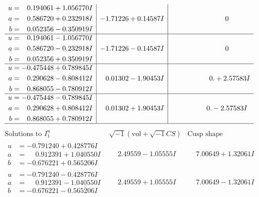 \documentclass[1p]{elsarticle_modified}
\theoremstyle{definition}
\newcommand{\I}{\sqrt{-1}}
\begin{document}
$$\begin{array}{c|c|c}
\begin{aligned}
u &= \phantom{-}0.194061 + 1.056770 I \\
a &= \phantom{-}0.586720 + 0.232918 I \\
b &= \phantom{-}0.052356 - 0.350919 I\end{aligned}
 & -1.71226 + 0.14587 I & \phantom{-0.000000 } 0 \\ \hline\begin{aligned}
u &= \phantom{-}0.194061 - 1.056770 I \\
a &= \phantom{-}0.586720 - 0.232918 I \\
b &= \phantom{-}0.052356 + 0.350919 I\end{aligned}
 & -1.71226 - 0.14587 I & \phantom{-0.000000 } 0 \\ \hline\begin{aligned}
u &= -0.475448 + 0.789845 I \\
a &= \phantom{-}0.290628 - 0.808412 I \\
b &= \phantom{-}0.868055 - 0.780912 I\end{aligned}
 & \phantom{-}0.01302 - 1.90453 I & \phantom{-0.000000 -}0. + 2.57583 I \\ \hline\begin{aligned}
u &= -0.475448 - 0.789845 I \\
a &= \phantom{-}0.290628 + 0.808412 I \\
b &= \phantom{-}0.868055 + 0.780912 I\end{aligned}
 & \phantom{-}0.01302 + 1.90453 I & \phantom{-0.000000 } 0. - 2.57583 I\\
 \hline 
 \end{array}$$\newpage$$\begin{array}{c|c|c}  
\text{Solutions to }I^u_{1}& \I (\text{vol} + \sqrt{-1}CS) & \text{Cusp shape}\\
 \hline 
\begin{aligned}
u &= -0.791240 + 0.428776 I \\
a &= \phantom{-}0.912391 + 1.040550 I \\
b &= -0.676221 + 0.565206 I\end{aligned}
 & \phantom{-}2.49559 - 1.05555 I & \phantom{-}7.00649 + 1.32061 I \\ \hline\begin{aligned}
u &= -0.791240 - 0.428776 I \\
a &= \phantom{-}0.912391 - 1.040550 I \\
b &= -0.676221 - 0.565206 I\end{aligned}
 & \phantom{-}2.49559 + 1.05555 I & \phantom{-}7.00649 - 1.32061 I \\ \hline\begin{aligned}

\end{aligned}
\end{array}$$
\end{document}
